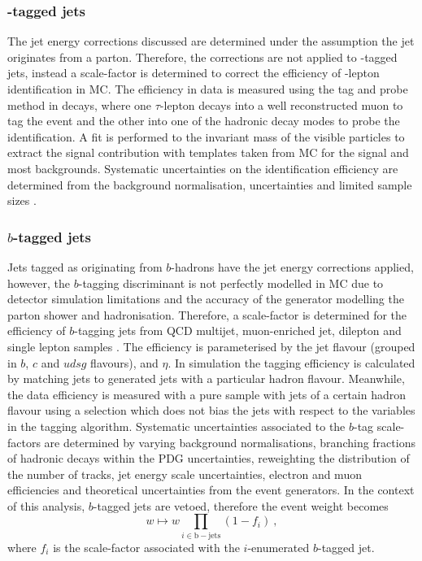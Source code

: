 \subsubsection{\Ptauh-tagged jets}

The jet energy corrections discussed are determined under the assumption the
jet originates from a parton. Therefore, the corrections are not applied to
\Ptauh-tagged jets, instead a scale-factor is determined to correct the
efficiency of \Ptauh-lepton identification in MC. The efficiency in data is
measured using the tag and probe method in \IDYtt decays, where one
$\tau$-lepton decays into a well reconstructed muon to tag the event and the
other into one of the hadronic decay modes to probe the identification. A fit
is performed to the invariant mass of the visible particles to extract the
signal contribution with templates taken from MC for the signal and most
backgrounds. Systematic uncertainties on the identification efficiency are
determined from the background normalisation, \ptmiss uncertainties and
limited sample sizes \cite{Sirunyan:2018pgf}.


\subsubsection{$b$-tagged jets}

Jets tagged as originating from $b$-hadrons have the jet energy corrections
applied, however, the $b$-tagging discriminant is not perfectly modelled in MC
due to detector simulation limitations and the accuracy of the generator
modelling the parton shower and hadronisation. Therefore, a scale-factor is
determined for the efficiency of $b$-tagging jets from QCD multijet,
muon-enriched jet, dilepton \Itt and single lepton \Itt samples
\cite{Sirunyan:2017ezt}. The efficiency is parameterised by the jet flavour
(grouped in $b$, $c$ and $udsg$ flavours), \pt and $\eta$. In simulation the
tagging efficiency is calculated by matching jets to generated jets with a
particular hadron flavour. Meanwhile, the data efficiency is measured with a
pure sample with jets of a certain hadron flavour using a selection which does
not bias the jets with respect to the variables in the tagging algorithm.
Systematic uncertainties associated to the $b$-tag scale-factors are
determined by varying background normalisations, branching fractions of
hadronic decays within the PDG uncertainties, reweighting the distribution of
the number of tracks, jet energy scale uncertainties, electron and muon
efficiencies and theoretical uncertainties from the event generators. In the
context of this analysis, $b$-tagged jets are vetoed, therefore the event
weight becomes
%
\begin{equation}
    w \mapsto w \prod_{i\in\mathrm{b-jets}} (1 - f_i)\ ,
\end{equation}
%
where $f_i$ is the scale-factor associated with the $i$-enumerated $b$-tagged
jet.

